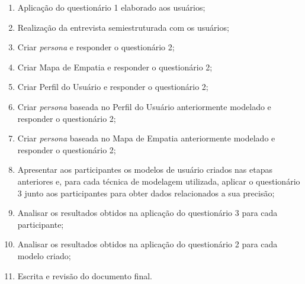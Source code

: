 \documentclass[12pt]{article}
\begin{document}
    \begin{enumerate}\setlength\itemsep{0.5em}
        \item Aplicação do questionário 1 elaborado aos usuários;
        \item Realização da entrevista semiestruturada com os usuários;
        \item Criar \emph{persona} e responder o questionário 2;
        \item Criar Mapa de Empatia e responder o questionário 2;
        \item Criar Perfil do Usuário e responder o questionário 2;
        \item Criar \emph{persona} baseada no Perfil do Usuário anteriormente modelado e responder o questionário 2;
        \item Criar \emph{persona} baseada no Mapa de Empatia anteriormente modelado e responder o questionário 2;
        \item Apresentar aos participantes os modelos de usuário criados nas etapas anteriores e, para cada técnica de modelagem utilizada, aplicar o questionário 3 junto aos participantes para obter dados relacionados a sua precisão;
        \item Analisar os resultados obtidos na aplicação do questionário 3 para cada participante;
        \item Analisar os resultados obtidos na aplicação do questionário 2 para cada modelo criado;
        \item Escrita e revisão do documento final.
    \end{enumerate}
    
\end{document}

